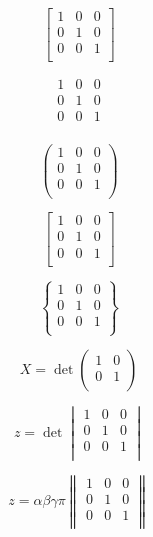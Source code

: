 \documentclass[12pt,ngerman,parskip=full]{scrreprt}
\begin{document}
\[\left[
\begin{array}{ccc} 
1 & 0 & 0 \\ 
0 & 1 & 0 \\ 
0 & 0 & 1 \\ 
\end{array}\right]
\]

\[
\begin{matrix} 
1 & 0 & 0 \\ 
0 & 1 & 0 \\ 
0 & 0 & 1 \\ 
\end{matrix}
\]

\[
\begin{pmatrix} 
1 & 0 & 0 \\ 
0 & 1 & 0 \\ 
0 & 0 & 1 \\ 
\end{pmatrix}
\]

\[
\begin{bmatrix} 
1 & 0 & 0 \\ 
0 & 1 & 0 \\ 
0 & 0 & 1 \\ 
\end{bmatrix}
\]

\[
\begin{Bmatrix} 
1 & 0 & 0 \\ 
0 & 1 & 0 \\ 
0 & 0 & 1 \\ 
\end{Bmatrix}
\]


\[ X = \det 
\begin{pmatrix} 
1 & 0 \\ 
0 & 1 \\ 
\end{pmatrix}
\]

\[ z = \det 
\begin{vmatrix} 
1 & 0 & 0 \\ 
0 & 1 & 0 \\ 
0 & 0 & 1 \\ 
\end{vmatrix}
\]

\[ z = \alpha \beta \gamma \pi 
\begin{Vmatrix} 
1 & 0 & 0 \\ 
0 & 1 & 0 \\ 
0 & 0 & 1 \\ 
\end{Vmatrix}
\]
\end{document}
